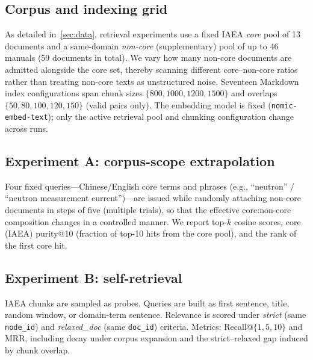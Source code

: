 \subsection{Corpus and indexing grid}
As detailed in~\cref{sec:data}, retrieval experiments use a fixed IAEA \emph{core} pool of 13 documents
and a same-domain \emph{non-core} (supplementary) pool of up to 46 manuals (59 documents in total).
We vary how many non-core documents are admitted alongside the core set, thereby scanning different
core--non-core ratios rather than treating non-core texts as unstructured noise.
Seventeen Markdown index configurations span chunk sizes $\{800,1000,1200,1500\}$ and overlaps
$\{50,80,100,120,150\}$ (valid pairs only).
The embedding model is fixed (\texttt{nomic-embed-text}); only the active retrieval pool and chunking
configuration change across runs.

\subsection{Experiment A: corpus-scope extrapolation}
Four fixed queries---Chinese/English core terms and phrases (e.g., ``neutron'' /
``neutron measurement current'')---are issued while randomly attaching non-core documents in steps
of five (multiple trials), so that the effective core:non-core composition changes in a controlled
manner.
We report top-$k$ cosine scores, core (IAEA) purity@10 (fraction of top-10 hits from the core pool),
and the rank of the first core hit.

\subsection{Experiment B: self-retrieval}
IAEA chunks are sampled as probes.
Queries are built as first sentence, title, random window, or domain-term sentence.
Relevance is scored under \emph{strict} (same \texttt{node\_id}) and \emph{relaxed\_doc} (same
\texttt{doc\_id}) criteria.
Metrics: Recall@$\{1,5,10\}$ and MRR, including decay under corpus expansion and the strict--relaxed
gap induced by chunk overlap.
